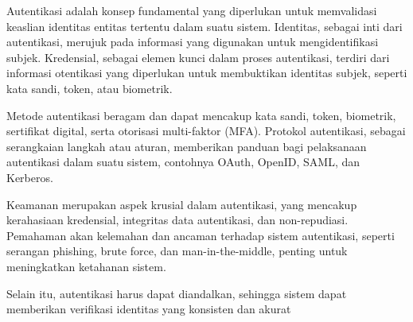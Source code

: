 Autentikasi adalah konsep fundamental yang diperlukan untuk memvalidasi keaslian identitas entitas tertentu dalam suatu sistem. Identitas, sebagai inti dari autentikasi, merujuk pada informasi yang digunakan untuk mengidentifikasi subjek. Kredensial, sebagai elemen kunci dalam proses autentikasi, terdiri dari informasi otentikasi yang diperlukan untuk membuktikan identitas subjek, seperti kata sandi, token, atau biometrik.

Metode autentikasi beragam dan dapat mencakup kata sandi, token, biometrik, sertifikat digital, serta otorisasi multi-faktor (MFA). Protokol autentikasi, sebagai serangkaian langkah atau aturan, memberikan panduan bagi pelaksanaan autentikasi dalam suatu sistem, contohnya OAuth, OpenID, SAML, dan Kerberos.

Keamanan merupakan aspek krusial dalam autentikasi, yang mencakup kerahasiaan kredensial, integritas data autentikasi, dan non-repudiasi. Pemahaman akan kelemahan dan ancaman terhadap sistem autentikasi, seperti serangan phishing, brute force, dan man-in-the-middle, penting untuk meningkatkan ketahanan sistem.

Selain itu, autentikasi harus dapat diandalkan, sehingga sistem dapat memberikan verifikasi identitas yang konsisten dan akurat